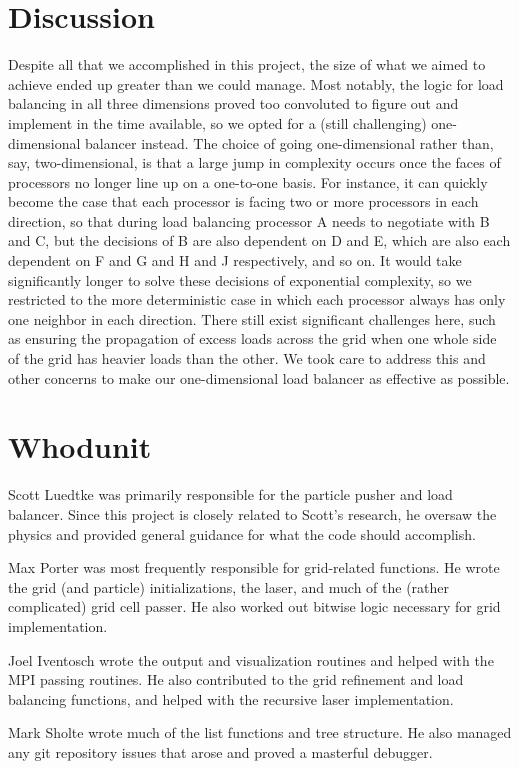 \documentclass[]{article}
\begin{document}
\section{Discussion}
Despite all that we accomplished in this project, the size of what we aimed to achieve ended up greater than we could manage. Most notably, the logic for load balancing in all three dimensions proved too convoluted to figure out and implement in the time available, so we opted for a (still challenging) one-dimensional balancer instead. The choice of going one-dimensional rather than, say, two-dimensional, is that a large jump in complexity occurs once the faces of processors no longer line up on a one-to-one basis. For instance, it can quickly become the case that each processor is facing two or more processors in each direction, so that during load balancing processor A needs to negotiate with B and C, but the decisions of B are also dependent on D and E, which are also each dependent on F and G and H and J respectively, and so on. It would take significantly longer to solve these decisions of exponential complexity, so we restricted to the more deterministic case in which each processor always has only one neighbor in each direction. There still exist significant challenges here, such as ensuring the propagation of excess loads across the grid when one whole side of the grid has heavier loads than the other. We took care to address this and other concerns to make our one-dimensional load balancer as effective as possible.

\section{Whodunit}
Scott Luedtke was primarily responsible for the particle pusher and load balancer.  Since this project is closely related to Scott's research, he oversaw the physics and provided general guidance for what the code should accomplish.

Max Porter was most frequently responsible for grid-related functions. He wrote the grid (and particle) initializations, the laser, and much of the (rather complicated) grid cell passer. He also worked out bitwise logic necessary for grid implementation.

Joel Iventosch wrote the output and visualization routines and helped with the MPI passing routines.  He also contributed to the grid refinement and load balancing functions, and helped with the recursive laser implementation.

Mark Sholte wrote much of the list functions and tree structure.  He also managed any git repository issues that arose and proved a masterful debugger.
\end{document}
